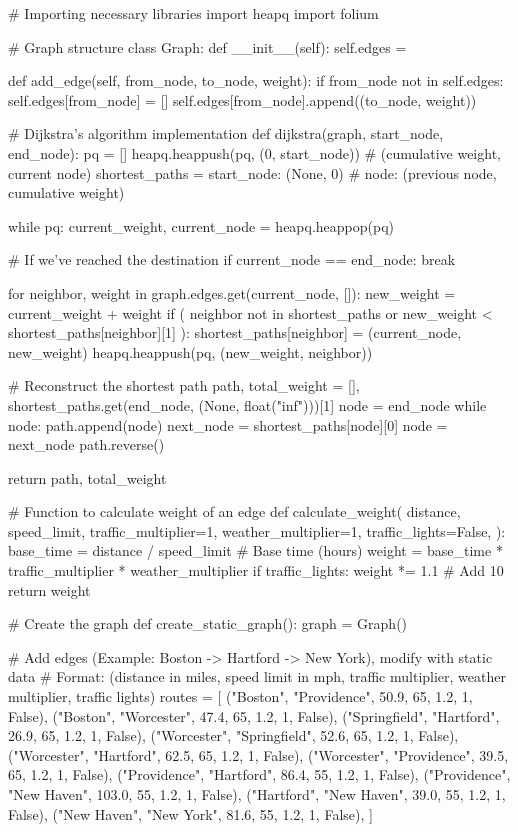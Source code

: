 \documentclass{article}
\begin{document}
\begin{python}
# Importing necessary libraries
import heapq
import folium


# Graph structure
class Graph:
    def __init__(self):
        self.edges = {}

    def add_edge(self, from_node, to_node, weight):
        if from_node not in self.edges:
            self.edges[from_node] = []
        self.edges[from_node].append((to_node, weight))


# Dijkstra's algorithm implementation
def dijkstra(graph, start_node, end_node):
    pq = []
    heapq.heappush(pq, (0, start_node))  # (cumulative weight, current node)
    shortest_paths = {start_node: (None, 0)}  # node: (previous node, cumulative weight)

    while pq:
        current_weight, current_node = heapq.heappop(pq)

        # If we've reached the destination
        if current_node == end_node:
            break

        for neighbor, weight in graph.edges.get(current_node, []):
            new_weight = current_weight + weight
            if (
                neighbor not in shortest_paths
                or new_weight < shortest_paths[neighbor][1]
            ):
                shortest_paths[neighbor] = (current_node, new_weight)
                heapq.heappush(pq, (new_weight, neighbor))

    # Reconstruct the shortest path
    path, total_weight = [], shortest_paths.get(end_node, (None, float("inf")))[1]
    node = end_node
    while node:
        path.append(node)
        next_node = shortest_paths[node][0]
        node = next_node
    path.reverse()

    return path, total_weight


# Function to calculate weight of an edge
def calculate_weight(
    distance,
    speed_limit,
    traffic_multiplier=1,
    weather_multiplier=1,
    traffic_lights=False,
):
    base_time = distance / speed_limit  # Base time (hours)
    weight = base_time * traffic_multiplier * weather_multiplier
    if traffic_lights:
        weight *= 1.1  # Add 10%
    return weight


# Create the graph
def create_static_graph():
    graph = Graph()

    # Add edges (Example: Boston -> Hartford -> New York), modify with static data
    # Format: (distance in miles, speed limit in mph, traffic multiplier, weather multiplier, traffic lights)
    routes = [
        ("Boston", "Providence", 50.9, 65, 1.2, 1, False),
        ("Boston", "Worcester", 47.4, 65, 1.2, 1, False),
        ("Springfield", "Hartford", 26.9, 65, 1.2, 1, False),
        ("Worcester", "Springfield", 52.6, 65, 1.2, 1, False),
        ("Worcester", "Hartford", 62.5, 65, 1.2, 1, False),
        ("Worcester", "Providence", 39.5, 65, 1.2, 1, False),
        ("Providence", "Hartford", 86.4, 55, 1.2, 1, False),
        ("Providence", "New Haven", 103.0, 55, 1.2, 1, False),
        ("Hartford", "New Haven", 39.0, 55, 1.2, 1, False),
        ("New Haven", "New York", 81.6, 55, 1.2, 1, False),
    ]


\end{python}
\end{document}
